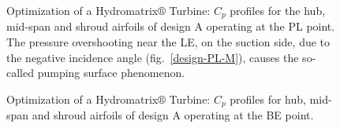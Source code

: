 \begin{figure}[h!]
\begin{minipage}[b]{1\linewidth}
 \centering
\end{minipage}
\caption{Optimization of a Hydromatrix$\circledR$ Turbine: $C_p$ profiles for the hub, mid-span and shroud airfoils of design A operating at the PL point. The pressure overshooting near the LE, on the suction side, due to the negative incidence angle (fig.\ \ref{design-PL-M}), causes the so-called pumping surface phenomenon.}
\label{LOADPLM}
\end{figure}

\begin{figure}[h!]
\begin{minipage}[b]{1\linewidth}
 \centering
\end{minipage}
\caption{Optimization of a Hydromatrix$\circledR$ Turbine: $C_p$ profiles for hub, mid-span and shroud airfoils of design A operating at the BE point.}
\label{LOADBEM}
\end{figure}

